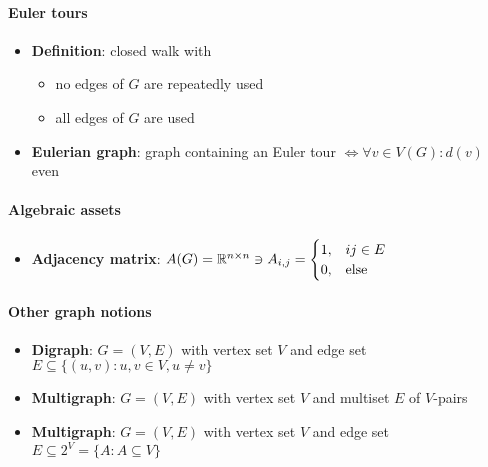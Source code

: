 \paragraph{Euler tours}
\begin{itemize}
  \item \textbf{Definition}: closed walk with
  \begin{itemize}
    \item no edges of $ G $ are repeatedly used
    \item all edges of $ G $ are used 
  \end{itemize}
  \item \textbf{Eulerian graph}: graph containing an Euler tour $ \Leftrightarrow \forall v \in V(G) : d(v) $ even 
\end{itemize}

\paragraph{Algebraic assets}
\begin{itemize}
  \item \textbf{Adjacency matrix}: $ A(G) = \mathbb{R}^{n \times n} \ni A_{i,j} = \begin{cases}
    1, & ij \in E \\
    0, & \text{else}
  \end{cases} $
\end{itemize}

\paragraph{Other graph notions}
\begin{itemize}
  \item \textbf{Digraph}: $ G = (V,E) $ with vertex set $ V $ and edge set $ E \subseteq \{ (u,v) : u,v \in V, u \neq v \} $
  \item \textbf{Multigraph}: $ G = (V,E) $ with vertex set $ V $ and multiset $ E $ of $ V $-pairs
  \item \textbf{Multigraph}: $ G = (V,E) $ with vertex set $ V $ and edge set $ E \subseteq 2^V = \{ A : A \subseteq V \} $
\end{itemize}